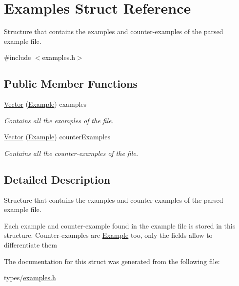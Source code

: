 \hypertarget{struct_examples}{}\section{Examples Struct Reference}
\label{struct_examples}


Structure that contains the examples and counter-\/examples of the parsed example file.  




{\ttfamily \#include $<$examples.\+h$>$}

\subsection*{Public Member Functions}
\begin{DoxyCompactItemize}
\item 
\hyperlink{struct_examples_a8ff909f5f0ee4280abc8eb36461fcd81}{Vector} (\hyperlink{struct_example}{Example}) examples\hypertarget{struct_examples_a8ff909f5f0ee4280abc8eb36461fcd81}{}\label{struct_examples_a8ff909f5f0ee4280abc8eb36461fcd81}

\begin{DoxyCompactList}\small\item\em Contains all the examples of the file. \end{DoxyCompactList}\item 
\hyperlink{struct_examples_a5cf7ae0c32dd265c9063dd6416ece41b}{Vector} (\hyperlink{struct_example}{Example}) counter\+Examples\hypertarget{struct_examples_a5cf7ae0c32dd265c9063dd6416ece41b}{}\label{struct_examples_a5cf7ae0c32dd265c9063dd6416ece41b}

\begin{DoxyCompactList}\small\item\em Contains all the counter-\/examples of the file. \end{DoxyCompactList}\end{DoxyCompactItemize}


\subsection{Detailed Description}
Structure that contains the examples and counter-\/examples of the parsed example file. 

Each example and counter-\/example found in the example file is stored in this structure. Counter-\/examples are \hyperlink{struct_example}{Example} too, only the fields allow to differentiate them 

The documentation for this struct was generated from the following file\+:\begin{DoxyCompactItemize}
\item 
types/\hyperlink{examples_8h}{examples.\+h}\end{DoxyCompactItemize}
